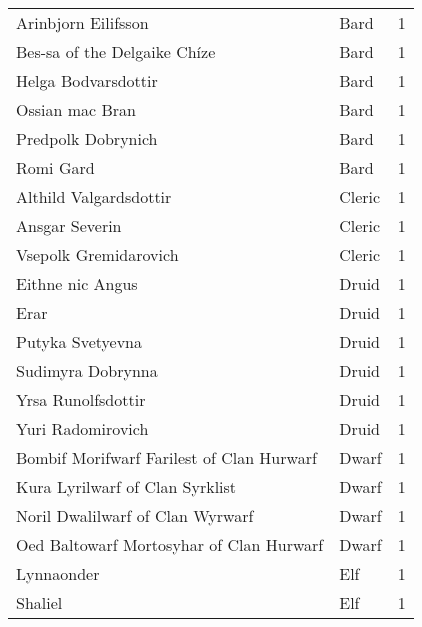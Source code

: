 \begin{tcolorbox}[breakable, title=Index by class]
\begin{supertabular}{p{0.6\columnwidth}lr}
Arinbjorn Eilifsson                                & Bard            &     1\\
Bes-sa of the Delgaike Ch\'ize                     & Bard            &     1\\
Helga Bodvarsdottir                                & Bard            &     1\\
Ossian mac Bran                                    & Bard            &     1\\
Predpolk Dobrynich                                 & Bard            &     1\\
Romi Gard                                          & Bard            &     1\\
Althild Valgardsdottir                             & Cleric          &     1\\
Ansgar Severin                                     & Cleric          &     1\\
Vsepolk Gremidarovich                              & Cleric          &     1\\
Eithne nic Angus                                   & Druid           &     1\\
Erar                                               & Druid           &     1\\
Putyka Svetyevna                                   & Druid           &     1\\
Sudimyra Dobrynna                                  & Druid           &     1\\
Yrsa Runolfsdottir                                 & Druid           &     1\\
Yuri Radomirovich                                  & Druid           &     1\\
Bombif Morifwarf Farilest of Clan Hurwarf          & Dwarf           &     1\\
Kura Lyrilwarf of Clan Syrklist                    & Dwarf           &     1\\
Noril Dwalilwarf of Clan Wyrwarf                   & Dwarf           &     1\\
Oed Baltowarf Mortosyhar of Clan Hurwarf           & Dwarf           &     1\\
Lynnaonder                                         & Elf             &     1\\
Shaliel                                            & Elf             &     1\\

\end{supertabular}
\end{tcolorbox}
